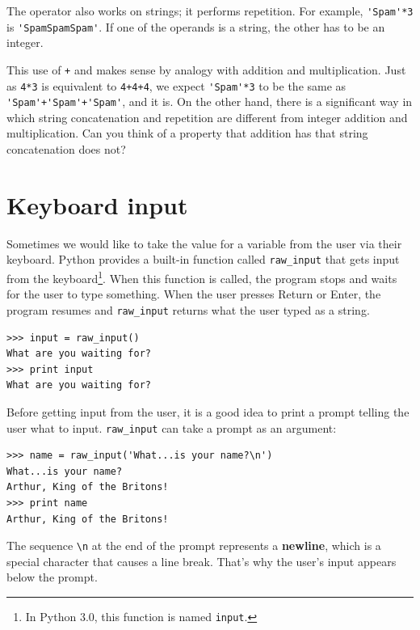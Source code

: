 \documentclass[10pt]{book}
\begin{document}
The {\tt *} operator also works on strings; it performs repetition.
For example, \verb"'Spam'*3" is \verb"'SpamSpamSpam'".  If one of the operands
is a string, the other has to be an integer.

This use of {\tt +} and {\tt *} makes sense by
analogy with addition and multiplication.  Just as {\tt 4*3} is
equivalent to {\tt 4+4+4}, we expect \verb"'Spam'*3" to be the same as
\verb"'Spam'+'Spam'+'Spam'", and it is.  On the other hand, there is a
significant way in which string concatenation and repetition are
different from integer addition and multiplication.
Can you think of a property that addition has
that string concatenation does not?


\section{Keyboard input}

Sometimes we would like to take the value for a variable from the user
via their keyboard.
Python provides a built-in function called \verb"raw_input" that gets
input from the keyboard\footnote{In Python 3.0, this function is named
  {\tt input}.}.  When this function is called, the program stops and
waits for the user to type something.  When the user presses {\sf
  Return} or {\sf Enter}, the program resumes and \verb"raw_input"
returns what the user typed as a string.


\beforeverb
\begin{verbatim}
>>> input = raw_input()
What are you waiting for?
>>> print input
What are you waiting for?
\end{verbatim}
\afterverb
%
Before getting input from the user, it is a good idea to print a
prompt telling the user what to input.  \verb"raw_input" can take a
prompt as an argument:


\beforeverb
\begin{verbatim}
>>> name = raw_input('What...is your name?\n')
What...is your name?
Arthur, King of the Britons!
>>> print name
Arthur, King of the Britons!
\end{verbatim}
\afterverb
%
The sequence \verb"\n" at the end of the prompt represents a {\bf newline},
which is a special character that causes a line break.
That's why the user's input appears below the prompt.
\end{document}

